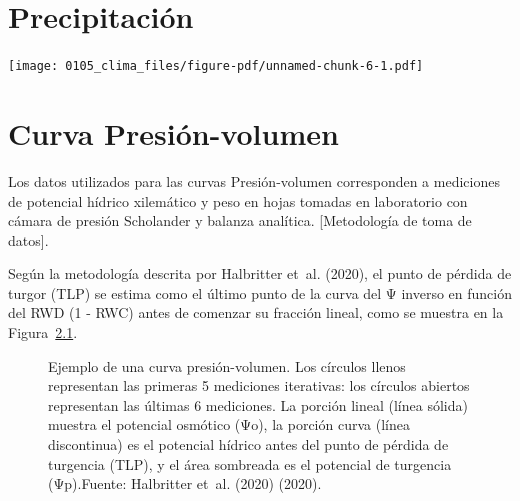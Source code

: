 \documentclass[
  letterpaper,
  DIV=11,
  numbers=noendperiod]{scrreprt}
\begin{document}
\chapter{Precipitación}

\begin{center}
\texttt{[image: 0105\_clima\_files/figure-pdf/unnamed-chunk-6-1.pdf]}
\end{center}

\chapter{Curva Presión-volumen}\label{sec-pv}

Los datos utilizados para las curvas Presión-volumen corresponden a
mediciones de potencial hídrico xilemático y peso en hojas tomadas en
laboratorio con cámara de presión Scholander y balanza analítica.
{[}Metodología de toma de datos{]}.

Según la metodología descrita por Halbritter et~al. (2020), el punto de
pérdida de turgor (TLP) se estima como el último punto de la curva del Ψ
inverso en función del RWD (1 - RWC) antes de comenzar su fracción
lineal, como se muestra en la Figura~\ref{fig-tlp}.

\begin{figure}


\caption{\label{fig-tlp}Ejemplo de una curva presión-volumen. Los
círculos llenos representan las primeras 5 mediciones iterativas: los
círculos abiertos representan las últimas 6 mediciones. La porción
lineal (línea sólida) muestra el potencial osmótico (Ψo), la porción
curva (línea discontinua) es el potencial hídrico antes del punto de
pérdida de turgencia (TLP), y el área sombreada es el potencial de
turgencia (Ψp).Fuente: Halbritter et~al. (2020) (2020).}

\end{figure}%
\end{document}
